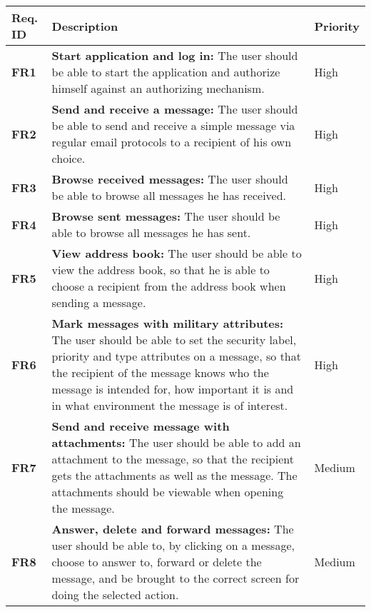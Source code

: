 
\begin{longtable}{>{\setlength\hsize{.3\hsize}}X|>{\setlength\hsize{0.9\hsize}}X|>{\setlength\hsize{.3\hsize}}X}\hline
\textbf{Req. ID} & \textbf{Description} & \textbf{Priority} \\ \hline \hline

\textbf{FR1} & \textbf{Start application and log in:} The user should be able to start the application and authorize himself against an authorizing mechanism. & High \\ \hline

\textbf{FR2} & \textbf{Send and receive a message:} The user should be able to send and receive a simple message via regular email protocols to a recipient of his own choice. & High \\ \hline

\textbf{FR3} & \textbf{Browse received messages:} The user should be able to browse all messages he has received. & High \\ \hline

\textbf{FR4} & \textbf{Browse sent messages:} The user should be able to browse all messages he has sent.& High \\ \hline

\textbf{FR5} & \textbf{View address book:} The user should be able to view the address book, so that he is able to choose a recipient from the address book when sending a message. & High \\ \hline

\textbf{FR6} & \textbf{Mark messages with military attributes:} The user should be able to set the security label, priority and type attributes on a message, so that the recipient of the message knows who the message is intended for, how important it is and in what environment the message is of interest. & High \\ \hline

\textbf{FR7} & \textbf{Send and receive message with attachments:} The user should be able to add an attachment to the message, so that the recipient gets the attachments as well as the message. The attachments should be viewable when opening the message. & Medium \\ \hline

\textbf{FR8} & \textbf{Answer, delete and forward messages:} The user should be able to, by clicking on a message, choose to answer to, forward or delete the message, and be brought to the correct screen for doing the selected action. & Medium \\ \hline


\end{longtable}
